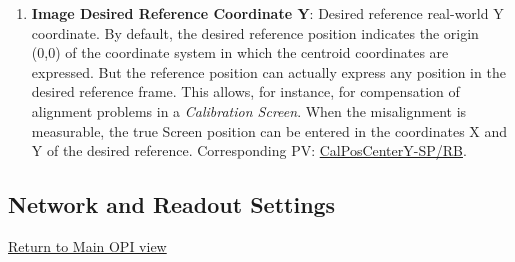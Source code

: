 \documentclass[openany]{article}
\begin{document}
\begin{enumerate}
            \item \textbf{Image Desired Reference Coordinate Y}: Desired reference real-world Y coordinate. By default, the desired reference position indicates the origin (0,0) of the coordinate system in which the centroid coordinates are expressed. But the reference position can actually express any position in the desired reference frame. This allows, for instance, for compensation of alignment problems in a \emph{Calibration Screen}. When the misalignment is measurable, the true Screen position can be entered in the coordinates X and Y of the desired reference. Corresponding PV: \hyperlink{pv:cal-pos-center-y}{CalPosCenterY-SP/RB}.
        \end{enumerate}

    \subsection{Network and Readout Settings}\label{sec:network-and-readout}

        \hyperref[fig:opi-main]{Return to Main OPI view}
\end{document}
